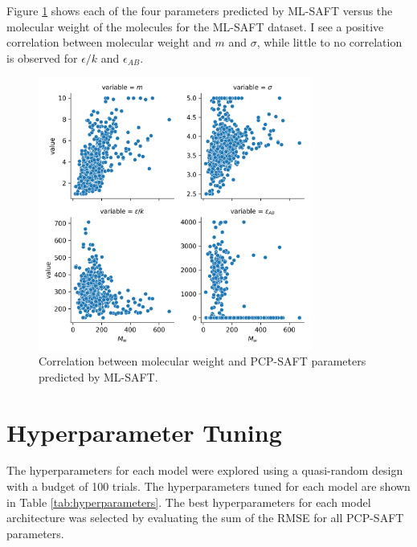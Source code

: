 Figure \ref{fig:molecular_weight} shows each of the four parameters predicted by ML-SAFT versus the molecular weight of the molecules for the ML-SAFT dataset. I see a positive correlation between molecular weight and $m$ and $\sigma$, while little to no correlation is observed for $\epsilon/k$ and $\epsilon_{AB}$.

\begin{figure}
    \centering
    \includegraphics[width=0.8\textwidth]{gfx/Chapter08/mw_pcsaft_parameter_correlation.png}
    \caption{Correlation between molecular weight and PCP-SAFT parameters predicted by ML-SAFT.}
    \label{fig:molecular_weight}
\end{figure}

\section{Hyperparameter Tuning}

The hyperparameters for each model were explored using a quasi-random design \cite{Bosquet2017} with a budget of 100 trials. The hyperparameters tuned for each model are shown in Table \ref{tab:hyperparameters}. The best hyperparameters for each model architecture was selected by evaluating the sum of the RMSE for all PCP-SAFT parameters.

